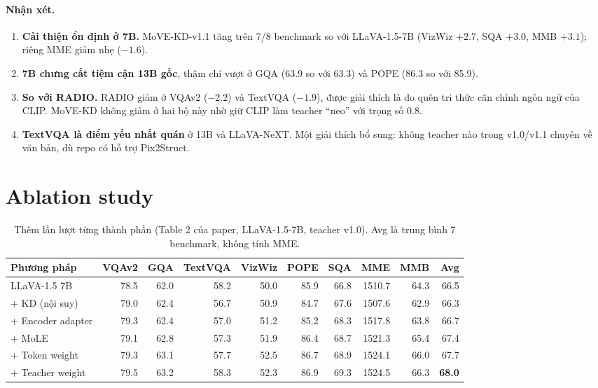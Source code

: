 \documentclass[11pt,a4paper]{article}
\newcommand{\best}[1]{\textbf{#1}}
\begin{document}
\paragraph{Nhận xét.}
\begin{enumerate}
\item \textbf{Cải thiện ổn định ở 7B.} MoVE-KD-v1.1 tăng trên 7/8 benchmark so với LLaVA-1.5-7B (VizWiz $+2.7$, SQA $+3.0$, MMB $+3.1$); riêng MME giảm nhẹ ($-1.6$).
\item \textbf{7B chưng cất tiệm cận 13B gốc}, thậm chí vượt ở GQA (63.9 so với 63.3) và POPE (86.3 so với 85.9).
\item \textbf{So với RADIO.} RADIO giảm ở VQAv2 ($-2.2$) và TextVQA ($-1.9$), được giải thích là do quên tri thức căn chỉnh ngôn ngữ của CLIP. MoVE-KD không giảm ở hai bộ này nhờ giữ CLIP làm teacher ``neo'' với trọng số 0.8.
\item \textbf{TextVQA là điểm yếu nhất quán} ở 13B và LLaVA-NeXT. Một giải thích bổ sung: không teacher nào trong v1.0/v1.1 chuyên về văn bản, dù repo có hỗ trợ Pix2Struct.
\end{enumerate}

\section{Ablation study}

\begin{table}[H]
\centering
\caption{Thêm lần lượt từng thành phần (Table 2 của paper, LLaVA-1.5-7B, teacher v1.0). Avg là trung bình 7 benchmark, không tính MME.}
\label{tab:abl}
\small
\setlength{\tabcolsep}{4.5pt}
\begin{tabular}{@{}lrrrrrrrrr@{}}
\toprule
Phương pháp & VQAv2 & GQA & TextVQA & VizWiz & POPE & SQA & MME & MMB & Avg \\
\midrule
LLaVA-1.5 7B & 78.5 & 62.0 & 58.2 & 50.0 & 85.9 & 66.8 & 1510.7 & 64.3 & 66.5 \\
+ KD (nội suy) & 79.0 & 62.4 & 56.7 & 50.9 & 84.7 & 67.6 & 1507.6 & 62.9 & 66.3 \\
+ Encoder adapter & 79.3 & 62.4 & 57.0 & 51.2 & 85.2 & 68.3 & 1517.8 & 63.8 & 66.7 \\
+ MoLE & 79.1 & 62.8 & 57.3 & 51.9 & 86.4 & 68.7 & 1521.3 & 65.4 & 67.4 \\
+ Token weight & 79.3 & 63.1 & 57.7 & 52.5 & 86.7 & 68.9 & 1524.1 & 66.0 & 67.7 \\
+ Teacher weight & 79.5 & 63.2 & 58.3 & 52.3 & 86.9 & 69.3 & 1524.5 & 66.3 & \best{68.0} \\
\bottomrule
\end{tabular}
\end{table}
\end{document}
